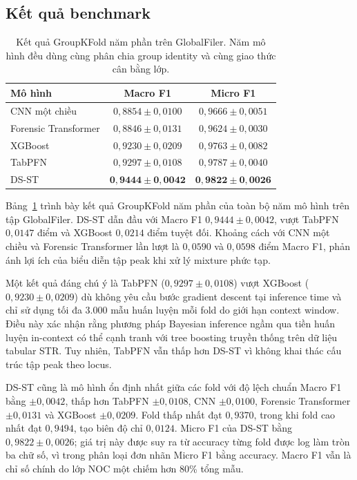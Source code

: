 \documentclass[12pt,a4paper]{article}
\begin{document}
\subsection{Kết quả benchmark}

\begin{table}[H]
\centering
\caption{Kết quả GroupKFold năm phần trên GlobalFiler. Năm mô hình đều dùng cùng phân chia group identity và cùng giao thức cân bằng lớp.}
\label{tab:benchmark}
\small
\begin{tabular}{lcc}
\toprule
\textbf{Mô hình} & \textbf{Macro F1} & \textbf{Micro F1} \\
\midrule
CNN một chiều       & \(0{,}8854\pm0{,}0100\) & \(0{,}9666\pm0{,}0051\) \\
Forensic Transformer & \(0{,}8846\pm0{,}0131\) & \(0{,}9624\pm0{,}0030\) \\
XGBoost             & \(0{,}9230\pm0{,}0209\) & \(0{,}9763\pm0{,}0082\) \\
TabPFN              & \(0{,}9297\pm0{,}0108\) & \(0{,}9787\pm0{,}0040\) \\
DS-ST  & \(\mathbf{0{,}9444\pm0{,}0042}\) & \(\mathbf{0{,}9822\pm0{,}0026}\) \\
\bottomrule
\end{tabular}
\end{table}

Bảng~\ref{tab:benchmark} trình bày kết quả GroupKFold năm phần của toàn bộ năm mô hình trên tập GlobalFiler. DS-ST dẫn đầu với Macro F1 $0{,}9444\pm0{,}0042$, vượt TabPFN $0{,}0147$ điểm và XGBoost $0{,}0214$ điểm tuyệt đối. Khoảng cách với CNN một chiều và Forensic Transformer lần lượt là $0{,}0590$ và $0{,}0598$ điểm Macro F1, phản ánh lợi ích của biểu diễn tập peak khi xử lý mixture phức tạp.

Một kết quả đáng chú ý là TabPFN ($0{,}9297\pm0{,}0108$) vượt XGBoost ($0{,}9230\pm0{,}0209$) dù không yêu cầu bước gradient descent tại inference time và chỉ sử dụng tối đa 3.000 mẫu huấn luyện mỗi fold do giới hạn context window. Điều này xác nhận rằng phương pháp Bayesian inference ngầm qua tiền huấn luyện in-context có thể cạnh tranh với tree boosting truyền thống trên dữ liệu tabular STR. Tuy nhiên, TabPFN vẫn thấp hơn DS-ST vì không khai thác cấu trúc tập peak theo locus.

DS-ST cũng là mô hình ổn định nhất giữa các fold với độ lệch chuẩn Macro F1 bằng $\pm0{,}0042$, thấp hơn TabPFN $\pm0{,}0108$, CNN $\pm0{,}0100$, Forensic Transformer $\pm0{,}0131$ và XGBoost $\pm0{,}0209$. Fold thấp nhất đạt $0{,}9370$, trong khi fold cao nhất đạt $0{,}9494$, tạo biên độ chỉ $0{,}0124$. Micro F1 của DS-ST bằng $0{,}9822\pm0{,}0026$; giá trị này được suy ra từ accuracy từng fold được log làm tròn ba chữ số, vì trong phân loại đơn nhãn Micro F1 bằng accuracy. Macro F1 vẫn là chỉ số chính do lớp NOC một chiếm hơn 80\% tổng mẫu.
\end{document}
